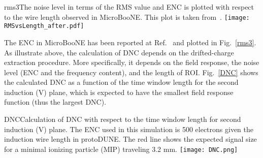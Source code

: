 \begin{cdrfigure}{rms3}{The noise level in terms of the RMS value and ENC 
is plotted with respect to the wire length observed in MicroBooNE. 
This plot is taken from~\cite{noise_filter}.}
\texttt{[image: RMSvsLength\_after.pdf]}
\end{cdrfigure}

The ENC in MicroBooNE has been reported at Ref.~\cite{noise_filter} and plotted 
in Fig.~\ref{rms3}. As illustrate above, the calculation of DNC depends on the 
drifted-charge extraction procedure. More specifically, it depends on the field 
response, the noise level (ENC and the frequency content), and the length of ROI. 
Fig.~\ref{DNC} shows the calculated DNC as a function of the time window length 
for the second induction (V) plane, which is expected to have the smallest field 
response function (thus the largest DNC). 

\begin{cdrfigure}{DNC}{Calculation of DNC with respect to the time window length for second induction (V) plane. 
The ENC used in this simulation is 500 electrons given the induction wire length in protoDUNE. 
The red line shows the expected signal size for a minimal ionizing particle (MIP) 
traveling 3.2 mm.}
\texttt{[image: DNC.png]}
\end{cdrfigure}


